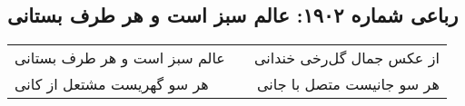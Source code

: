 \begin{center}
\section*{رباعی شماره ۱۹۰۲: عالم سبز است و هر طرف بستانی}
\label{sec:1902}
\begin{longtable}{l p{0.5cm} r}
عالم سبز است و هر طرف بستانی
&&
از عکس جمال گل‌رخی خندانی
\\
هر سو گهریست مشتعل از کانی
&&
هر سو جانیست متصل با جانی
\\
\end{longtable}
\end{center}
